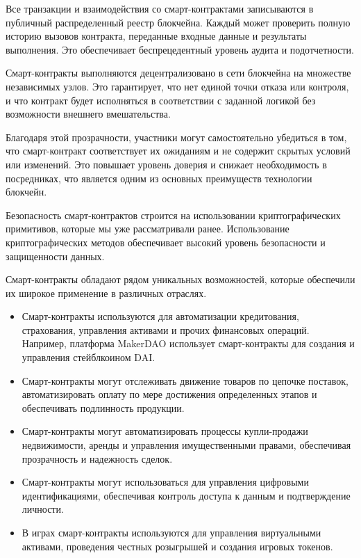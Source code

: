Все транзакции и взаимодействия со смарт-контрактами записываются в публичный распределенный реестр блокчейна. Каждый может проверить полную историю вызовов контракта, переданные входные данные и результаты выполнения. Это обеспечивает беспрецедентный уровень аудита и подотчетности.

Смарт-контракты выполняются децентрализовано в сети блокчейна на множестве независимых узлов. Это гарантирует, что нет единой точки отказа или контроля, и что контракт будет исполняться в соответствии с заданной логикой без возможности внешнего вмешательства.

Благодаря этой прозрачности, участники могут самостоятельно убедиться в том, что смарт-контракт соответствует их ожиданиям и не содержит скрытых условий или изменений. Это повышает уровень доверия и снижает необходимость в посредниках, что является одним из основных преимуществ технологии блокчейн.

Безопасность смарт-контрактов строится на использовании криптографических примитивов, которые мы уже рассматривали ранее. Использование криптографических методов обеспечивает высокий уровень безопасности и защищенности данных.

Смарт-контракты обладают рядом уникальных возможностей, которые обеспечили их широкое применение в различных отраслях.

\begin{itemize}
	\item Смарт-контракты используются для автоматизации кредитования, страхования, управления активами и прочих финансовых операций. Например, платформа MakerDAO использует смарт-контракты для создания и управления стейблкоином DAI\cite{label36}.

	\item Смарт-контракты могут отслеживать движение товаров по цепочке поставок, автоматизировать оплату по мере достижения определенных этапов и обеспечивать подлинность продукции\cite{label35}.

	\item Смарт-контракты могут автоматизировать процессы купли-продажи недвижимости, аренды и управления имущественными правами, обеспечивая прозрачность и надежность сделок\cite{label34}.

	\item Смарт-контракты могут использоваться для управления цифровыми идентификациями, обеспечивая контроль доступа к данным и подтверждение личности\cite{label33}.

	\item  В играх смарт-контракты используются для управления виртуальными активами, проведения честных розыгрышей и создания игровых токенов\cite{label32}.
\end{itemize}

